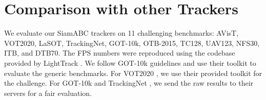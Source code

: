   \section{Comparison with other Trackers} \label{sec:benchmarks}
  We evaluate our SiamABC trackers on 11 challenging benchmarks: AVisT\cite{noman2022avist}, VOT2020\cite{kristan2020eighth}, LaSOT\cite{fan2021lasot}, TrackingNet\cite{muller2018trackingnet}, GOT-10k\cite{Huang2021}, OTB-2015\cite{7001050}, TC128\cite{liang2015encoding}, UAV123\cite{mueller2016benchmark}, NFS30\cite{kiani2017need}, ITB\cite{li2021informative}, and DTB70\cite{drone-tracking}. The FPS numbers were reproduced using the codebase provided by LightTrack \cite{yan2021lighttrack}. We follow GOT-10k\cite{Huang2021} guidelines and use their toolkit \cite{githubGitHubGot10ktoolkit} to evaluate the generic benchmarks. For VOT2020 \cite{kristan2020eighth}, we use their provided toolkit for the challenge. For GOT-10k\cite{Huang2021} and TrackingNet \cite{muller2018trackingnet}, we send the raw results to their servers for a fair evaluation. 
  
